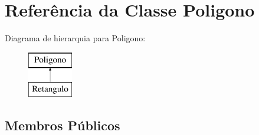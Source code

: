 \hypertarget{class_poligono}{}\section{Referência da Classe Poligono}
\label{class_poligono}
Diagrama de hierarquia para Poligono\+:\begin{figure}[H]
\begin{center}
\leavevmode
\includegraphics[height=2.000000cm]{class_poligono}
\end{center}
\end{figure}
\subsection*{Membros Públicos}

